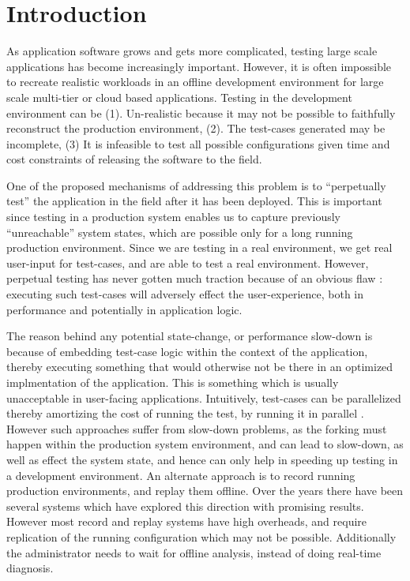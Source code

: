 
\section{Introduction}
\label{sec:intro}



As application software grows and gets more complicated, testing large scale applications has become increasingly important. 
However, it is often impossible to recreate realistic workloads in an offline development environment for large scale multi-tier or cloud based applications.
Testing in the development environment can be (1). Un-realistic because it may not be possible to faithfully reconstruct the production environment, (2). The test-cases generated may be incomplete, (3) It is infeasible to test all possible configurations given time and cost constraints of releasing the software to the field. 

One of the proposed mechanisms of addressing this problem is to ``perpetually test''\cite{perpetual} the application in the field after it has been deployed. 
This is important since testing in a production system enables us to capture previously ``unreachable'' system states, which are possible only for a long running production environment.
Since we are testing in a real environment, we get real user-input for test-cases, and are able to test a real environment.
However, perpetual testing has never gotten much traction because of an obvious flaw : executing such test-cases will adversely effect the user-experience, both in performance and potentially in application logic.

The reason behind any potential state-change, or performance slow-down is because of embedding test-case logic within the context of the application, thereby executing something that would otherwise not be there in an optimized implmentation of the application.
This is something which is usually unacceptable in user-facing applications.
Intuitively, test-cases can be parallelized thereby amortizing the cost of running the test, by running it in parallel \cite{invite}.
However such approaches suffer from slow-down problems, as the forking must happen within the production system environment, and can lead to slow-down, as well as effect the system state, and hence can only help in speeding up testing in a development environment.
An alternate approach is to record running production environments, and replay them offline.
Over the years there have been several systems which have explored this direction with promising results.
However most record and replay systems have high overheads, and require replication of the running configuration which may not be possible. 
Additionally the administrator needs to wait for offline analysis, instead of doing real-time diagnosis.

